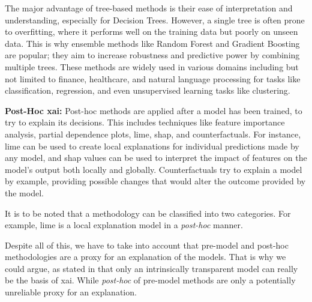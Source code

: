 The major advantage of tree-based methods is their ease of interpretation and understanding, especially for Decision Trees. However, a single tree is often prone to overfitting, where it performs well on the training data but poorly on unseen data. This is why ensemble methods like Random Forest and Gradient Boosting are popular; they aim to increase robustness and predictive power by combining multiple trees. These methods are widely used in various domains including but not limited to finance, healthcare, and natural language processing for tasks like classification, regression, and even unsupervised learning tasks like clustering.

\textbf{Post-Hoc \ac{xai}:} Post-hoc methods are applied after a model has been trained, to try to explain its decisions. This includes techniques like feature importance analysis, partial dependence plots, \ac{lime}, \ac{shap}, and counterfactuals. For instance, \ac{lime} can be used to create local explanations for individual predictions made by any model, and \ac{shap} values can be used to interpret the impact of features on the model's output both locally and globally. Counterfactuals try to explain a model by example, providing possible changes that would alter the outcome provided by the model.

It is to be noted that a methodology can be classified into two categories. For example, \ac{lime} is a local explanation model in a \textit{post-hoc} manner.

Despite all of this, we  have to take into account that pre-model and post-hoc methodologies are a proxy for an explanation of the models. That is why we could argue, as stated in \cite{rudinStopExplainingBlack2019} that only an intrinsically transparent model can really be the basis of \ac{xai}. While \textit{post-hoc} of pre-model methods are only a potentially unreliable proxy for an explanation.
